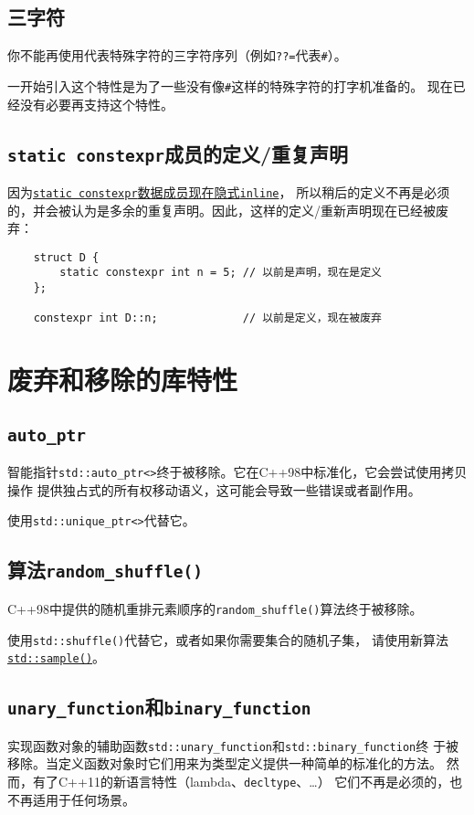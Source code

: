 \subsection{三字符}
你不能再使用代表特殊字符的三字符序列（例如\texttt{??=}代表\texttt{\#}）。

一开始引入这个特性是为了一些没有像\texttt{\#}这样的特殊字符的打字机准备的。
现在已经没有必要再支持这个特性。

\subsection{\texttt{static constexpr}成员的定义/重复声明}
因为\hyperref[ch3.3]{\texttt{static constexpr}数据成员现在隐式\texttt{inline}}，
所以稍后的定义不再是必须的，并会被认为是多余的重复声明。因此，这样的定义/重新声明现在已经被废弃：
\begin{lstlisting}
    struct D {
        static constexpr int n = 5; // 以前是声明，现在是定义
    };

    constexpr int D::n;             // 以前是定义，现在被废弃
\end{lstlisting}


\section{废弃和移除的库特性}

\subsection{\texttt{auto\_ptr}}
智能指针\texttt{std::auto\_ptr<>}终于被移除。它在C++98中标准化，它会尝试使用拷贝操作
提供独占式的所有权移动语义，这可能会导致一些错误或者副作用。

使用\texttt{std::unique\_ptr<>}代替它。

\subsection{算法\texttt{random\_shuffle()}}
C++98中提供的随机重排元素顺序的\texttt{random\_shuffle()}算法终于被移除。

使用\texttt{std::shuffle()}代替它，或者如果你需要集合的随机子集，
请使用新算法\hyperref[ch25.4]{\texttt{std::sample()}}。

\subsection{\texttt{unary\_function}和\texttt{binary\_function}}
实现函数对象的辅助函数\texttt{std::unary\_function}和\texttt{std::binary\_function}终
于被移除。当定义函数对象时它们用来为类型定义提供一种简单的标准化的方法。
然而，有了C++11的新语言特性（lambda、\texttt{decltype}、\ldots）
它们不再是必须的，也不再适用于任何场景。


